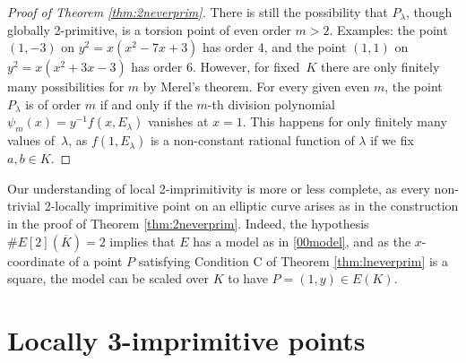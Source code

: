 \documentclass{amsart}
\theoremstyle{plain}
\theoremstyle{definition}
\begin{document}
\begin{proof}[Proof of Theorem \ref{thm:2neverprim}]
There is still the possibility that $P_\lambda$, though globally 2-primitive, is a torsion point of even order $m>2$.
Examples: 
the point $(1,-3)$ on $y^2=x(x^2-7x+3)$ has order 4, and 
the point $(1,1)$ on $y^2=x(x^2+3x-3)$ has order 6.
However, for fixed~$K$ there are only finitely many possibilities
for $m$ by Merel's theorem. 
For every given even $m$, the point $P_\lambda$ is of order $m$ 
if and only if the $m$-th division polynomial
$\psi_m(x)=y^{-1}f(x, E_\lambda)$ vanishes at $x=1$.
This happens for only finitely many values of~$\lambda$,
as $f(1,E_\lambda)$ is a non-constant rational function of $\lambda$ if we fix $a,b \in K$.
\end{proof}

\noindent 
Our understanding of local 2-imprimitivity is more or less complete, as
every non-trivial 2-locally imprimitive point on an elliptic curve arises
as in the construction in the proof of Theorem \ref{thm:2neverprim}.
Indeed, the hypothesis $\#E[2](\overline K)=2$ implies that $E$ has a model
as in \eqref{00model}, and as the $x$-coordinate of a point $P$ satisfying Condition C 
of Theorem \ref{thm:lneverprim} is a square, the model can be scaled over $K$ to have
$P=(1,y)\in E(K)$.



\section{Locally 3-imprimitive points}
\label{S:Locally 3-imprimitive points}
\end{document}
